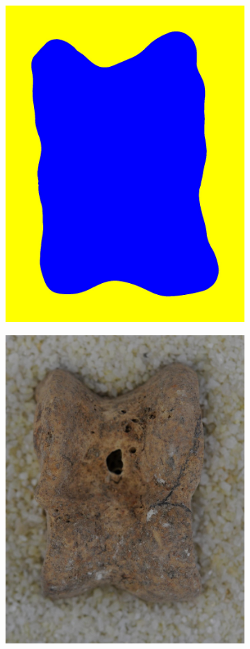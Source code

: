 \documentclass[pdftex,12pt,a4paper]{report}
\begin{document}
\begin{figure}[h]
\begin{subfigure}[b]{0.24\textwidth}
		\includegraphics[width=.9\linewidth]{img/segmentation/good/watershed/segmented.jpg}
		\subcaption*{}
	\end{subfigure}
	\begin{subfigure}[b]{0.24\textwidth}
		\centering
		\includegraphics[width=.9\linewidth]{img/segmentation/bad/watershed/cut.jpg}

\end{subfigure}
\end{figure}
\end{document}
